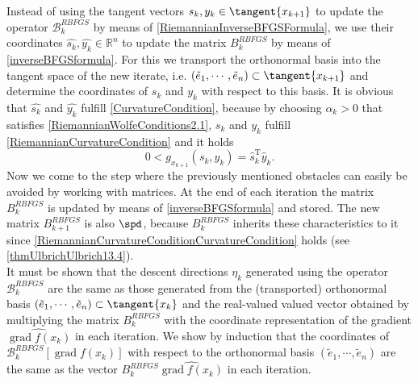 Instead of using the tangent vectors $s_k, y_k \in \tangent{x_{k+1}}$ to update the operator $\mathcal{B}^{RBFGS}_k$ by means of \cref{RiemannianInverseBFGSFormula}, we use their coordinates $\hat{s_k}, \hat{y_k} \in \mathbb{R}^n$ to update the matrix $B^{RBFGS}_k$ by means of \cref{inverseBFGSformula}. For this we transport the orthonormal basis into the tangent space of the new iterate, i.e. $(\tilde{e}_1, \cdots, \tilde{e}_n) \subset \tangent{x_{k+1}}$ and determine the coordinates of $s_k$ and $y_k$ with respect to this basis. It is obvious that $\hat{s_k}$ and $\hat{y_k}$ fulfill \cref{CurvatureCondition}, because by choosing $\alpha_k > 0$ that satisfies \cref{RiemannianWolfeConditions2.1}, $s_k$ and $y_k$ fulfill \cref{RiemannianCurvatureCondition} and it holds
\begin{equation}\label{RiemannianCurvatureConditionCurvatureCondition}
    0 < g_{x_{k+1}}(s_k, y_k) = \hat{s}^{\mathrm{T}}_k \hat{y}_k.
\end{equation}
Now we come to the step where the previously mentioned obstacles can easily be avoided by working with matrices. At the end of each iteration the matrix $B^{RBFGS}_k$ is updated by means of \cref{inverseBFGSformula} and stored. The new matrix $B^{RBFGS}_{k+1}$ is also $\spd$, because $B^{RBFGS}_k$ inherits these characteristics to it since \cref{RiemannianCurvatureConditionCurvatureCondition} holds (see \cref{thmUlbrichUlbrich13.4}). \\

It must be shown that the descent directions $\eta_k$ generated using the operator $\mathcal{B}^{RBFGS}_k$ are the same as those generated from the (transported) orthonormal basis $(\tilde{e}_1, \cdots, \tilde{e}_n) \subset \tangent{x_k}$ and the real-valued valued vector obtained by multiplying the matrix $B^{RBFGS}_k$ with the coordinate representation of the gradient $\widehat{\operatorname{grad} f(x_k)}$ in each iteration. We show by induction that the coordinates of $\mathcal{B}^{RBFGS}_k [\operatorname{grad} f(x_k)]$ with respect to the orthonormal basis $(\tilde{e}_1, \cdots, \tilde{e}_n)$ are the same as the vector $B^{RBFGS}_k \widehat{\operatorname{grad} f(x_k)}$ in each iteration. \\

